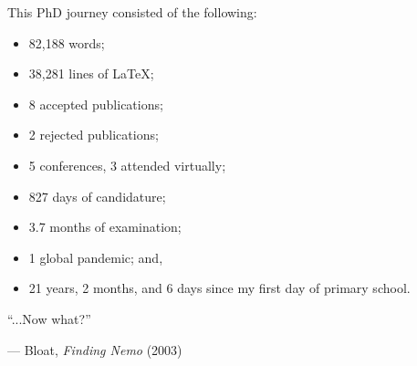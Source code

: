 
\cleardoublepage
\thispagestyle{empty}

\vspace*{\fill}

\rmfamily

This PhD journey consisted of the following:

\bigskip

\begin{itemize}
    \item 82,188 words;
    \item 38,281 lines of \LaTeX;
    \item 8 accepted publications;
    \item 2 rejected publications;
    \item 5 conferences, 3 attended virtually;
    \item 827 days of candidature;
    \item 3.7 months of examination;
    \item 1 global pandemic; and,
    \item 21 years, 2 months, and 6 days since my first day of primary school.
\end{itemize}

\bigskip


\epigraph{``...Now what?''}{--- Bloat, \textit{Finding Nemo} (2003)}
\vspace*{\fill}